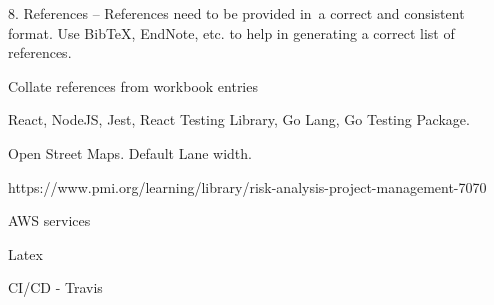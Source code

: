 \documentclass[a4paper,11pt]{article}
\begin{document}
8. References – References need to be provided in a correct and consistent format. Use BibTeX, EndNote, etc. to help in generating a correct list of references.


Collate references from workbook entries

React, NodeJS, Jest, React Testing Library, Go Lang, Go Testing Package.

Open Street Maps.
Default Lane width.

https://www.pmi.org/learning/library/risk-analysis-project-management-7070

AWS services

Latex

CI/CD - Travis
\end{document}
